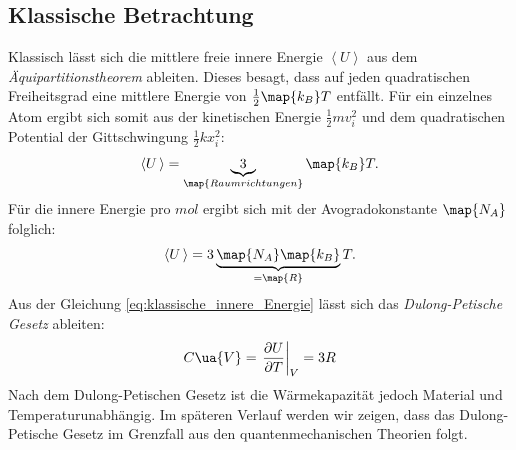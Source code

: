 \subsection{Klassische Betrachtung}
Klassisch lässt sich die mittlere freie innere Energie $\left<U\right>$ aus dem
\emph{Äquipartitionstheorem} ableiten. Dieses besagt, dass auf jeden quadratischen
Freiheitsgrad eine mittlere Energie von $\frac{1}{2}\map{k_B}T$ entfällt.
Für ein einzelnes Atom ergibt sich somit aus der kinetischen Energie $\frac{1}{2}mv_i^2$ und
dem quadratischen Potential der Gittschwingung $\frac{1}{2}kx_i^2$:
\begin{equation}
  \label{eq:innere_Energie}
  \left<U\,\right> = \underbrace{3}_{\map{Raumrichtungen}}\map{k_B}T.
\end{equation}
Für die innere Energie pro $\si{mol}$ ergibt sich mit der Avogradokonstante
$\map{N_A}$ folglich:
\begin{equation}
  \label{eq:klassische_innere_Energie}
  \left<U\,\right> = 3\underbrace{\map{N_A} \map{k_B}}_{=\map{R}} T.
\end{equation}
Aus der Gleichung \eqref{eq:klassische_innere_Energie} lässt sich das
\emph{Dulong-Petische Gesetz} ableiten:
\begin{equation}
  \label{eq:dulong_petit}
  C\ua{V}=\left. \frac{\partial U}{\partial T}\right|_{V}=3R
\end{equation}
Nach dem Dulong-Petischen Gesetz ist die Wärmekapazität jedoch Material und
Temperaturunabhängig. Im späteren Verlauf werden wir zeigen, dass das Dulong-Petische Gesetz
im Grenzfall aus den quantenmechanischen Theorien folgt.

